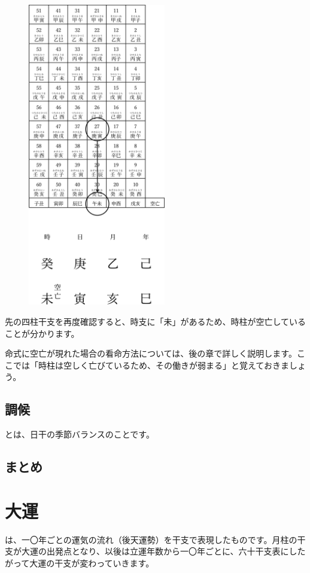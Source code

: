 \documentclass[a5paper,11pt,dvipdfmx]{tarticle}
\begin{document}
\begin{figure}[h]
  \centering
  \includegraphics[width=60mm,angle=90]{figs/figure3-13.eps}
\end{figure}

先の四柱干支を再度確認すると、時支に「未」があるため、時柱が空亡していることが分かります。

命式に空亡が現れた場合の看命方法については、後の章で詳しく説明します。ここでは「時柱は空しく亡びているため、その働きが弱まる」と覚えておきましょう。

\subsection{調候}
とは、日干の季節バランスのことです。



\subsection{まとめ}


\clearpage

\section{大運}

は、一〇年ごとの運気の流れ（後天運勢）を干支で表現したものです。月柱の干支が大運の出発点となり、以後は立運年数から一〇年ごとに、六十干支表にしたがって大運の干支が変わっていきます。
\end{document}
